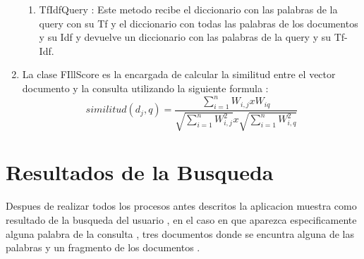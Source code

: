 \documentclass[12 pts,spanish]{article}
\begin{document}
\begin{enumerate}
\begin{enumerate}
        \item TfIdfQuery : Este metodo recibe el diccionario con las palabras de la query con su Tf y el diccionario con todas las palabras de los documentos y su Idf y devuelve un diccionario con las palabras de la query y su Tf-Idf.
        
    \end{enumerate}
    \item La clase FIllScore es la encargada de calcular la similitud entre el vector documento y la consulta utilizando la siguiente formula :
    \begin{equation}
     similitud(d_{j},q) = \frac{\sum_{i=1}^{n} W_{i,j} x  W_{iq}}{\sqrt{\sum_{i=1}^{n} W_{i,j}^2}  x  \sqrt{\sum_{i=1}^{n} W_{i,q}^2}}
    \end{equation} 
    
\end {enumerate}

\section{Resultados de la Busqueda}
Despues de realizar todos los procesos antes descritos la aplicacion muestra como resultado de la busqueda del usuario , en el caso en que aparezca especificamente alguna palabra de la consulta , tres documentos donde se encuntra alguna de las palabras y un fragmento de los documentos .
\end{document}

